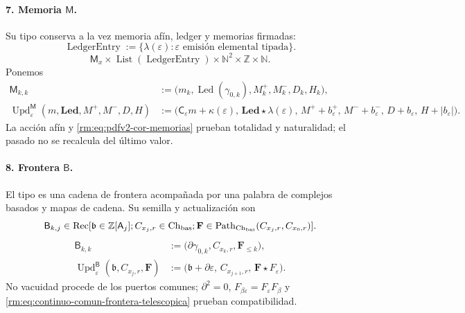 \paragraph{7. Memoria \(\mathsf M\).}
Su tipo conserva a la vez memoria afín, ledger y memorias firmadas:
\begin{equation}
\label{rm:eq:pdfv2-terminal-tipo-ledger-entry}
 \operatorname{LedgerEntry}:=
 \{\lambda(\varepsilon):\varepsilon\text{ emisión elemental tipada}\}.
\end{equation}
\[
 \mathsf M_x\times\operatorname{List}(\operatorname{LedgerEntry})
 \times\mathbb N^2\times\mathbb Z\times\mathbb N.
\]
Ponemos
\begin{align}
 \mathsf M_{k,k}&:=
 \bigl(m_k,\operatorname{Led}(\gamma_{0,k}),
       M_k^+,M_k^-,D_k,H_k\bigr),
 \label{rm:eq:pdfv2-terminal-semilla-m}\\
 \operatorname{Upd}^{\mathsf M}_{\varepsilon}
 (m,\mathbf{Led},M^+,M^-,D,H)
 &:=
 \bigl(\mathsf C_\varepsilon m+\kappa(\varepsilon),\,
 \mathbf{Led}\star\lambda(\varepsilon),\,
 M^++b_\varepsilon^+,\,M^-+b_\varepsilon^-,\,
 D+b_\varepsilon,\,H+|b_\varepsilon|\bigr).
 \label{rm:eq:pdfv2-terminal-update-m}
\end{align}
La acción afín y \eqref{rm:eq:pdfv2-cor-memorias} prueban totalidad y
naturalidad; el pasado no se recalcula del último valor.

\paragraph{8. Frontera \(\mathsf B\).}
El tipo es una cadena de frontera acompañada por una palabra de complejos
basados y mapas de cadena. Su semilla y actualización son
\[
 \mathsf B_{k,j}\in
 \operatorname{Rec}[\mathfrak b\in\mathbb Z[\mathsf A_j];
 C_{x_j,r}\in\operatorname{Ch}_{\rm bas};
 \mathbf F\in\operatorname{Path}_{\operatorname{Ch}_{\rm bas}}
 (C_{x_j,r},C_{x_0,r})].
\]
\begin{align}
 \mathsf B_{k,k}&:=
 \bigl(\partial\gamma_{0,k},C_{x_k,r},\mathbf F_{\leq k}\bigr),
 \label{rm:eq:pdfv2-terminal-semilla-b}\\
 \operatorname{Upd}^{\mathsf B}_{\varepsilon}
 (\mathfrak b,C_{x_j,r},\mathbf F)
 &:=
 \bigl(\mathfrak b+\partial\varepsilon,\,
 C_{x_{j+1},r},\,\mathbf F\star F_\varepsilon\bigr).
 \label{rm:eq:pdfv2-terminal-update-b}
\end{align}
No vacuidad procede de los puertos comunes; \(\partial^2=0\),
\(F_{\beta\varepsilon}=F_\varepsilon F_\beta\) y
\eqref{rm:eq:continuo-comun-frontera-telescopica} prueban compatibilidad.

